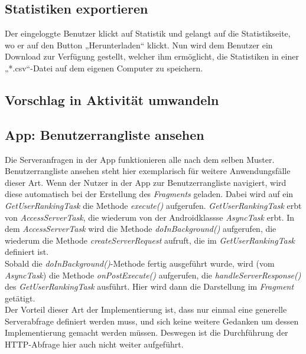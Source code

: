 \subsection{Statistiken exportieren}
Der eingeloggte Benutzer klickt auf Statistik und gelangt auf die Statistikseite, wo er auf den Button „Herunterladen“ klickt. Nun wird dem Benutzer ein Download zur Verfügung gestellt, welcher ihm ermöglicht, die Statistiken in einer „*.csv“-Datei auf dem eigenen Computer zu speichern.\\
\subsection{Vorschlag in Aktivität umwandeln}
\subsection{App: Benutzerrangliste ansehen}
Die Serveranfragen in der App funktionieren alle nach dem selben Muster. Benutzerrangliste ansehen steht hier exemplarisch für weitere Anwendungsfälle dieser Art.
Wenn der Nutzer in der App zur Benutzerrangliste navigiert, wird diese automatisch bei der Erstellung des \emph{Fragments} geladen. Dabei wird auf ein \emph{GetUserRankingTask} die Methode \emph{execute()} aufgerufen. \emph{GetUserRankingTask} erbt von \emph{AccessServerTask}, die wiederum von der Androidklassse \emph{AsyncTask} erbt. In dem \emph{AccessServerTask} wird die Methode \emph{doInBackground()} aufgerufen, die wiederum die Methode \emph{createServerRequest} aufruft, die im \emph{GetUserRankingTask} definiert ist.\\
Sobald die \emph{doInBackground()}-Methode fertig ausgeführt wurde, wird (vom \emph{AsyncTask}) die Methode \emph{onPostExecute()} aufgerufen, die \emph{handleServerResponse()} des \emph{GetUserRankingTask} ausführt. Hier wird dann die Darstellung im \emph{Fragment} getätigt.\\
Der Vorteil dieser Art der Implementierung ist, dass nur einmal eine generelle Serverabfrage definiert werden muss, und sich keine weitere Gedanken um dessen Implementierung gemacht werden m\"ussen. Deswegen ist die Durchführung der HTTP-Abfrage hier auch nicht weiter aufgeführt.